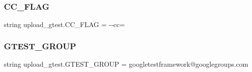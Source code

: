 \subsubsection{\texorpdfstring{CC\_FLAG}{CC\_FLAG}}
{\footnotesize\ttfamily string upload\+\_\+gtest.\+C\+C\+\_\+\+F\+L\+AG = \textquotesingle{}-\/-\/cc=\textquotesingle{}}

\mbox{\label{namespaceupload__gtest_af282f4c60bf6069ed0abf4e06d9b70ab}} 
\subsubsection{\texorpdfstring{GTEST\_GROUP}{GTEST\_GROUP}}
{\footnotesize\ttfamily string upload\+\_\+gtest.\+G\+T\+E\+S\+T\+\_\+\+G\+R\+O\+UP = \textquotesingle{}googletestframework@googlegroups.\+com\textquotesingle{}}

